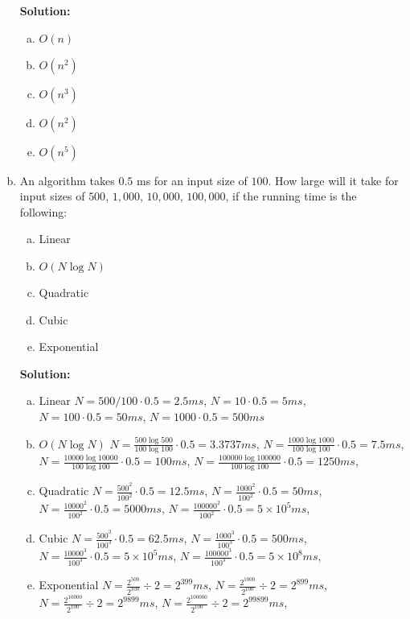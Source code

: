 \documentclass{article}\usepackage{amsmath,amssymb,amsthm,tikz,tkz-graph,color,chngpage,soul,hyperref,csquotes,graphicx,floatrow}\newcommand*{\QEDB}{\hfill\ensuremath{\square}}\newtheorem*{prop}{Proposition}\renewcommand{\theenumi}{\alph{enumi}}\usepackage[shortlabels]{enumitem}\usepackage[nobreak=true]{mdframed}\usetikzlibrary{matrix,calc}\MakeOuterQuote{"}\usepackage[margin=0.75in]{geometry} \newtheorem{theorem}{Theorem}
\begin{document}
\begin{enumerate}[(a)]
\begin{center}
\begin{BVerbatim}
\end{BVerbatim}
\end{center}
\begin{mdframed}
\textbf{Solution:} 
\begin{enumerate}[a.]
\item $O(n)$
\item $O(n^2)$
\item $O(n^3)$
\item $O(n^2)$
\item $O(n^5)$
\end{enumerate}
\end{mdframed}
\item An algorithm takes $0.5$ ms for an input size of $100$. How large will it take for input sizes of $500$, $1,000$, $10,000$, $100,000$, if the running time is the following:
\begin{enumerate}[a.]
\item Linear 
\item $O(N\log N)$
\item Quadratic
\item Cubic
\item Exponential
\end{enumerate}
\vspace{1mm}
\begin{mdframed}
\textbf{Solution:}
\begin{enumerate}[a.]
\item Linear $N=500/100\cdot{0.5}=2.5ms$, $N=10\cdot{0.5}=5ms$, $N=100\cdot 0.5=50ms$, $N=1000\cdot 0.5=500ms$
\item $O(N\log N)$ $N=\frac{500\log 500}{100\log 100}\cdot 0.5=3.3737ms$, $N=\frac{1000\log 1000}{100\log 100}\cdot 0.5=7.5ms$, $N=\frac{10000\log 10000}{100\log 100}\cdot 0.5=100ms$, $N=\frac{100000\log 100000}{100\log 100}\cdot 0.5=1250ms$, 
\item Quadratic $N=\frac{500^2}{100^2}\cdot 0.5=12.5ms$, $N=\frac{1000^2}{100^2}\cdot 0.5=50ms$, $N=\frac{10000^2}{100^2}\cdot 0.5=5000ms$, $N=\frac{100000^2}{100^2}\cdot 0.5=5\times 10^5ms$, 
\item Cubic $N=\frac{500^3}{100^3}\cdot 0.5=62.5ms$, $N=\frac{1000^3}{100^3}\cdot 0.5=500ms$, $N=\frac{10000^3}{100^3}\cdot 0.5=5\times 10^5ms$, $N=\frac{100000^3}{100^3}\cdot 0.5=5\times 10^8ms$, 
\item Exponential $N=\frac{2^{500}}{2^{100}}\div 2=2^{399}ms$, $N=\frac{2^{1000}}{2^{100}}\div 2=2^{899}ms$, $N=\frac{2^{10000}}{2^{100}}\div 2=2^{9899}ms$, $N=\frac{2^{100000}}{2^{100}}\div 2=2^{99899}ms$, 
\end{enumerate}
\end{mdframed}
\end{enumerate}
\end{document}

